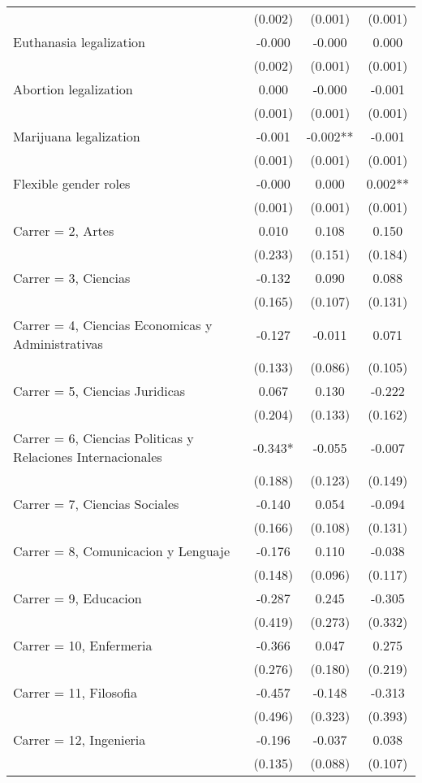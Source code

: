 \documentclass[]{article}
\begin{document}
\begin{tabular}{lccc}
 & (0.002) & (0.001) & (0.001) \\
Euthanasia legalization & -0.000 & -0.000 & 0.000 \\
 & (0.002) & (0.001) & (0.001) \\
Abortion legalization & 0.000 & -0.000 & -0.001 \\
 & (0.001) & (0.001) & (0.001) \\
Marijuana legalization & -0.001 & -0.002** & -0.001 \\
 & (0.001) & (0.001) & (0.001) \\
Flexible gender roles & -0.000 & 0.000 & 0.002** \\
 & (0.001) & (0.001) & (0.001) \\
Carrer = 2, Artes & 0.010 & 0.108 & 0.150 \\
 & (0.233) & (0.151) & (0.184) \\
Carrer = 3, Ciencias & -0.132 & 0.090 & 0.088 \\
 & (0.165) & (0.107) & (0.131) \\
Carrer = 4, Ciencias Economicas y Administrativas & -0.127 & -0.011 & 0.071 \\
 & (0.133) & (0.086) & (0.105) \\
Carrer = 5, Ciencias Juridicas & 0.067 & 0.130 & -0.222 \\
 & (0.204) & (0.133) & (0.162) \\
Carrer = 6, Ciencias Politicas y Relaciones Internacionales & -0.343* & -0.055 & -0.007 \\
 & (0.188) & (0.123) & (0.149) \\
Carrer = 7, Ciencias Sociales & -0.140 & 0.054 & -0.094 \\
 & (0.166) & (0.108) & (0.131) \\
Carrer = 8, Comunicacion y Lenguaje & -0.176 & 0.110 & -0.038 \\
 & (0.148) & (0.096) & (0.117) \\
Carrer = 9, Educacion & -0.287 & 0.245 & -0.305 \\
 & (0.419) & (0.273) & (0.332) \\
Carrer = 10, Enfermeria & -0.366 & 0.047 & 0.275 \\
 & (0.276) & (0.180) & (0.219) \\
Carrer = 11, Filosofia & -0.457 & -0.148 & -0.313 \\
 & (0.496) & (0.323) & (0.393) \\
Carrer = 12, Ingenieria & -0.196 & -0.037 & 0.038 \\
 & (0.135) & (0.088) & (0.107) \\

\end{tabular}
\end{document}
